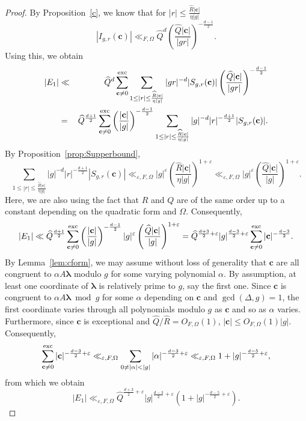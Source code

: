 \documentclass[10pt]{amsart}
\theoremstyle{plain}
\theoremstyle{plain}
\renewcommand{\vec}[1]{\mathbf{#1}}
\theoremstyle{remark}
\theoremstyle{definition}
\newcommand{\hQ}{\widehat{Q}}
\newcommand{\hR}{\widehat{R}}
\newcommand{\exc}{\textup{exc}}
\begin{document}
\begin{proof}
By Proposition~\ref{c}, we know that for $|r|\leq \frac{\hR |\vec{c}|}{\eta |g|}$
\[|I_{g,r}(\vec{c})|\ll_{F,\Omega}\hQ^d\left(\frac{\hQ|\vec{c}|}{|gr|}\right)^{-\frac{d-1}{2}}.\]
Using this, we obtain
\begin{eqnarray*}|E_1|&\ll& \hQ^d\sum_{\vec{c}\neq 0}^{\exc}\sum_{1\leq |r|\leq\frac{\hR |\vec{c}|}{\eta |g|}}|gr|^{-d}|S_{g,r}(\vec{c})|\left(\frac{\hQ|\vec{c}|}{|gr|}\right)^{-\frac{d-1}{2}}\\&=&\hQ^{\frac{d+1}{2}}\sum_{\vec{c}\neq 0}^{\exc}\left(\frac{|\vec{c}|}{|g|}\right)^{-\frac{d-1}{2}}\sum_{1\leq |r|\leq\frac{\hR |\vec{c}|}{\eta |g|}}|g|^{-d}|r|^{-\frac{d+1}{2}}|S_{g,r}(\vec{c})|.
\end{eqnarray*}
By Proposition~\ref{prop:Supperbound},
\[\sum_{1\leq |r|\leq\frac{\hR |\vec{c}|}{\eta |g|}}|g|^{-d}|r|^{-\frac{d+1}{2}}|S_{g,r}(\vec{c})|\ll_{\varepsilon,F,\Omega}|g|^{\varepsilon}\left(\frac{\hR |\vec{c}|}{\eta |g|}\right)^{1+\varepsilon}\ll_{\varepsilon,F,\Omega} |g|^{\varepsilon}\left(\frac{\hQ |\vec{c}|}{|g|}\right)^{1+\varepsilon}.\]
Here, we are also using the fact that $R$ and $Q$ are of the same order up to a constant depending on the quadratic form and $\Omega$. Consequently,
\[|E_1|\ll \hQ^{\frac{d+1}{2}}\sum_{\vec{c}\neq 0}^{\exc}\left(\frac{|\vec{c}|}{|g|}\right)^{-\frac{d-1}{2}}|g|^{\varepsilon}\left(\frac{\hQ |\vec{c}|}{|g|}\right)^{1+\varepsilon}=\hQ^{\frac{d+3}{2}+\varepsilon}|g|^{\frac{d-3}{2}+\varepsilon}\sum_{\vec{c}\neq 0}^{\exc}|\vec{c}|^{-\frac{d-3}{2}}.\]
By Lemma~\ref{lem:cform}, we may assume without loss of generality that $\vec{c}$ are all congruent to $\alpha A\boldsymbol{\lambda}$ modulo $g$ for some varying polynomial $\alpha$. By assumption, at least one coordinate of $\boldsymbol{\lambda}$ is relatively prime to $g$, say the first one. Since $\vec{c}$ is congruent to $\alpha A\boldsymbol{\lambda}\bmod g$ for some $\alpha$ depending on $\vec{c}$ and $\gcd(\Delta,g)=1$, the first coordinate varies through all polynomials modulo $g$ as $\vec{c}$ and so as $\alpha$ varies. Furthermore, since $\vec{c}$ is exceptional and $\hQ/\hR=O_{F,\Omega}(1)$, $|\vec{c}|\leq O_{F,\Omega}(1)|g|$. Consequently,
\[\sum_{\vec{c}\neq 0}^{\exc}|\vec{c}|^{-\frac{d-3}{2}+\varepsilon}\ll_{\varepsilon,F,\Omega} \sum_{0\neq|\alpha|<|g|}|\alpha|^{-\frac{d-3}{2}+\varepsilon}\ll_{\varepsilon,F,\Omega} 1+|g|^{-\frac{d-5}{2}+\varepsilon},\]
from which we obtain
\[|E_1|\ll_{\varepsilon,F,\Omega} \hQ^{\frac{d+3}{2}+\varepsilon}|g|^{\frac{d-3}{2}+\varepsilon}(1+|g|^{-\frac{d-5}{2}+\varepsilon}).\]
\end{proof}
\end{document}
